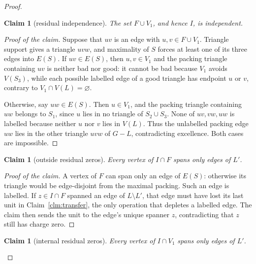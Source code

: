 \documentclass[11pt]{article}
\newtheorem{claim}[theorem]{Claim}
\theoremstyle{definition}
\begin{document}
\begin{proof}
\begin{claim}[residual independence]\label{clm:independent}
The set $F\cup V_1$, and hence $I$, is independent.
\end{claim}

\begin{proof}[Proof of the claim]
Suppose that $uv$ is an edge with $u,v\in F\cup V_1$.  Triangle support gives
a triangle $uvw$, and maximality of $S$ forces at least one of its three
edges into $E(S)$.  If $uv\in E(S)$, then $u,v\in V_1$ and the packing
triangle containing $uv$ is neither bad nor good: it cannot be bad because
$V_1$ avoids $V(S_3)$, while each possible labelled edge of a good triangle
has endpoint $u$ or $v$, contrary to $V_1\cap V(L)=\varnothing$.

Otherwise, say $uw\in E(S)$.  Then $u\in V_1$, and the packing triangle
containing $uw$ belongs to $S_1$, since $u$ lies in no triangle of
$S_2\cup S_3$.  None of $uv,vw,uw$ is labelled because neither $u$ nor $v$
lies in $V(L)$.  Thus the unlabelled packing edge $uw$ lies in the other
triangle $uvw$ of $G-L$, contradicting excellence.  Both cases are
impossible.
\end{proof}

\begin{claim}[outside residual zeros]\label{clm:fzero}
Every vertex of $I\cap F$ spans only edges of $L'$.
\end{claim}

\begin{proof}[Proof of the claim]
A vertex of $F$ can span only an edge of $E(S)$: otherwise its triangle would
be edge-disjoint from the maximal packing.  Such an edge is labelled.  If
$z\in I\cap F$ spanned an edge of $L\setminus L'$, that edge must have lost
its last unit in Claim~\ref{clm:transfer}, the only operation that depletes a
labelled edge.  The claim then sends the unit to the edge's unique spanner
$z$, contradicting that $z$ still has charge zero.
\end{proof}

\begin{claim}[internal residual zeros]\label{clm:vonezero}
Every vertex of $I\cap V_1$ spans only edges of $L'$.
\end{claim}


\end{proof}
\end{document}
